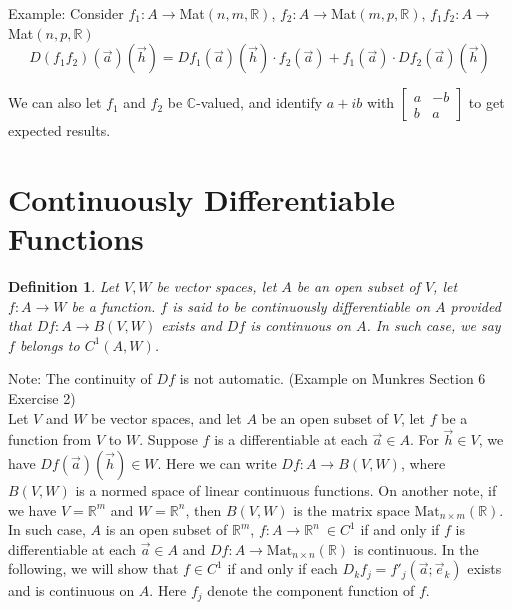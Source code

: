 \documentclass[11pt,oneside]{book}
\theoremstyle{break}
\theoremstyle{break}
\newtheorem{defn}{Definition}[corL]
\newcommand{\R}{\mathbb{R}}
\newcommand{\Complex}{\mathbb{C}}
\newcommand{\note}{\color{red}Note: \color{black}}
\newcommand{\example}{\color{green}Example: \color{black}}
\begin{document}
\example Consider $f_1:A \to $Mat$(n,m,\R)$, $f_2:A \to$Mat$(m,p,\R)$, $f_1f_2:A \to$Mat$(n,p,\R)$\\
$$D(f_1f_2)(\vec{a})(\vec{h}) = Df_1(\vec{a})(\vec{h})\cdot f_2(\vec{a})+f_1(\vec{a})\cdot Df_2(\vec{a})(\vec{h})$$

We can also let $f_1$ and $f_2$ be $\Complex$-valued, and identify $a+ib$ with $\begin{bmatrix} a & -b \\ b & a \end{bmatrix}$ to get expected results. 


























\newpage
\section[Continuously Differentiable Functions]{\color{red}Continuously Differentiable Functions \color{black}}
\begin{defn}
Let $V,W$ be vector spaces, let $A$ be an open subset of $V$, let $f:A \to W$ be a function. $f$ is said to be continuously differentiable on $A$ provided that $Df:A \to B(V,W)$ exists and $Df$ is continuous on $A$. In such case, we say $f$ belongs to $C^1(A,W)$.
\end{defn}
\note The continuity of $Df$ is not automatic. (Example on Munkres Section 6 Exercise 2)\\

Let $V$ and $W$ be vector spaces, and let $A$ be an open subset of $V$, let $f$ be a function from $V$ to $W$. Suppose $f$ is a differentiable at each $\vec{a}\in A$. For $\vec{h}\in V$, we have $Df(\vec{a})(\vec{h}) \in W$. Here we can write $Df:A \to B(V,W)$, where $B(V,W)$ is a normed space of linear continuous functions. On another note, if we have $V = \R^m$ and $W = \R^n$, then $B(V,W)$ is the matrix space $\text{Mat}_{n\times m}(\R)$. In such case, $A$ is an open subset of $\R^m$, $f:A \to \R^n \ \in C^1$ if and only if $f$ is differentiable at each $\vec{a}\in A$ and  $Df:A \to \text{Mat}_{n\times n}(\R)$ is continuous. In the following, we will show that $f \in C^1$ if and only if each $D_kf_j=f'_j(\vec{a};\vec{e}_k)$ exists and is continuous on $A$. Here $f_j$ denote the component function of $f$.
\end{document}

